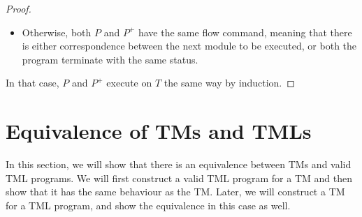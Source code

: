 \begin{appendices}
\begin{proof}
\begin{itemize}
\begin{itemize}
\begin{itemize}
                \item Otherwise, both $P$ and $P^+$ have the same flow command, meaning that there is either correspondence between the next module to be executed, or both the program terminate with the same status. 
            \end{itemize}
        \end{itemize}
    \end{itemize}
    In that case, $P$ and $P^+$ execute on $T$ the same way by induction.
\end{proof}

\section{Equivalence of TMs and TMLs}
In this section, we will show that there is an equivalence between TMs and valid TML programs. We will first construct a valid TML program for a TM and then show that it has the same behaviour as the TM. Later, we will construct a TM for a TML program, and show the equivalence in this case as well.

\begin{figure}[htb]
    \centering
\end{figure}
\end{appendices}
